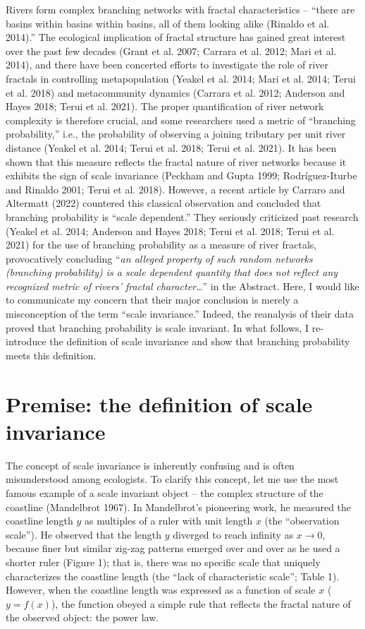 \documentclass[
  12pt,
]{article}
\begin{document}
Rivers form complex branching networks with fractal characteristics -- ``there are basins within basins within basins, all of them looking alike (Rinaldo et al. 2014).'' The ecological implication of fractal structure has gained great interest over the past few decades (Grant et al. 2007; Carrara et al. 2012; Mari et al. 2014), and there have been concerted efforts to investigate the role of river fractals in controlling metapopulation (Yeakel et al. 2014; Mari et al. 2014; Terui et al. 2018) and metacommunity dynamics (Carrara et al. 2012; Anderson and Hayes 2018; Terui et al. 2021). The proper quantification of river network complexity is therefore crucial, and some researchers used a metric of ``branching probability,'' i.e., the probability of observing a joining tributary per unit river distance (Yeakel et al. 2014; Terui et al. 2018; Terui et al. 2021). It has been shown that this measure reflects the fractal nature of river networks because it exhibits the sign of scale invariance (Peckham and Gupta 1999; Rodríguez-Iturbe and Rinaldo 2001; Terui et al. 2018). However, a recent article by Carraro and Altermatt (2022) countered this classical observation and concluded that branching probability is ``scale dependent.'' They seriously criticized past research (Yeakel et al. 2014; Anderson and Hayes 2018; Terui et al. 2018; Terui et al. 2021) for the use of branching probability as a measure of river fractals, provocatively concluding ``\emph{an alleged property of such random networks (branching probability) is a scale dependent quantity that does not reflect any recognized metric of rivers' fractal character\ldots{}}'' in the Abstract. Here, I would like to communicate my concern that their major conclusion is merely a misconception of the term ``scale invariance.'' Indeed, the reanalysis of their data proved that branching probability is scale invariant. In what follows, I re-introduce the definition of scale invariance and show that branching probability meets this definition.

\hypertarget{premise-the-definition-of-scale-invariance}{%
\section{Premise: the definition of scale invariance}\label{premise-the-definition-of-scale-invariance}}

The concept of scale invariance is inherently confusing and is often misunderstood among ecologists. To clarify this concept, let me use the most famous example of a scale invariant object -- the complex structure of the coastline (Mandelbrot 1967). In Mandelbrot's pioneering work, he measured the coastline length \(y\) as multiples of a ruler with unit length \(x\) (the ``observation scale''). He observed that the length \(y\) diverged to reach infinity as \(x \rightarrow 0\), because finer but similar zig-zag patterns emerged over and over as he used a shorter ruler (Figure 1); that is, there was no specific scale that uniquely characterizes the coastline length (the ``lack of characteristic scale''; Table 1). However, when the coastline length was expressed as a function of scale \(x\) (\(y = f(x)\)), the function obeyed a simple rule that reflects the fractal nature of the observed object: the power law.
\end{document}
